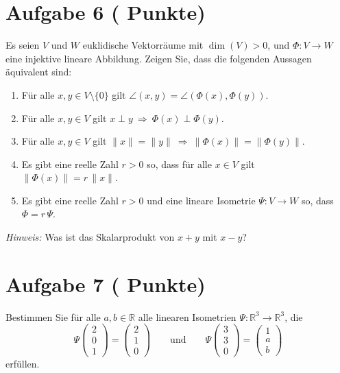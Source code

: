 \documentclass[11pt, a4paper]{article}
\newcommand{\aufgabe}[2]{%
  \section*{\Large\bfseries Aufgabe #1%
  \if\relax\detokenize{#2}\relax\else \hfill\normalfont\normalsize(#2 Punkte)\fi}%
  \vspace{-1.5ex}
}
\begin{document}
\aufgabe{6}{}
Es seien $V$ und $W$ euklidische Vektorräume mit $\dim(V)>0$, und $\Phi:V\to W$ eine injektive lineare Abbildung. Zeigen Sie, dass die folgenden Aussagen äquivalent sind:
\begin{enumerate}
  \item Für alle $x,y\in V\setminus\{0\}$ gilt $\angle(x,y)=\angle(\Phi(x),\Phi(y))$.
  \item Für alle $x,y\in V$ gilt $x\perp y\ \Rightarrow\ \Phi(x)\perp \Phi(y)$.
  \item Für alle $x,y\in V$ gilt $\|x\|=\|y\|\ \Rightarrow\ \|\Phi(x)\|=\|\Phi(y)\|$.
  \item Es gibt eine reelle Zahl $r>0$ so, dass für alle $x\in V$ gilt $\|\Phi(x)\|=r\,\|x\|$.
  \item Es gibt eine reelle Zahl $r>0$ und eine lineare Isometrie $\Psi:V\to W$ so, dass $\Phi=r\,\Psi$.
\end{enumerate}
\emph{Hinweis:} Was ist das Skalarprodukt von $x+y$ mit $x-y$?
\begin{framed}\end{framed}

\aufgabe{7}{}
Bestimmen Sie für alle $a,b\in\mathbb{R}$ alle linearen Isometrien $\Psi:\mathbb{R}^3\to\mathbb{R}^3$, die
\[
\Psi\!\begin{pmatrix}2\\0\\1\end{pmatrix}=\begin{pmatrix}2\\1\\0\end{pmatrix}
\qquad\text{und}\qquad
\Psi\!\begin{pmatrix}3\\3\\0\end{pmatrix}=\begin{pmatrix}1\\ a\\ b\end{pmatrix}
\]
erfüllen.
\begin{framed}\end{framed}
\end{document}
